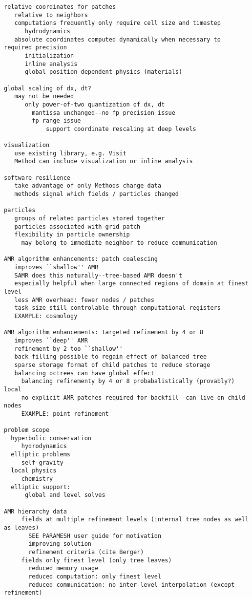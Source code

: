\documentclass[14pt,letter]{article}
\begin{document}
\begin{verbatim}
relative coordinates for patches   
   relative to neighbors
   computations frequently only require cell size and timestep
      hydrodynamics
   absolute coordinates computed dynamically when necessary to required precision
      initialization
      inline analysis
      global position dependent physics (materials)

global scaling of dx, dt?
   may not be needed
      only power-of-two quantization of dx, dt
        mantissa unchanged--no fp precision issue
        fp range issue
            support coordinate rescaling at deep levels
        
visualization
   use existing library, e.g. Visit
   Method can include visualization or inline analysis

software resilience
   take advantage of only Methods change data
   methods signal which fields / particles changed

particles
   groups of related particles stored together
   particles associated with grid patch
   flexibility in particle ownership
     may belong to immediate neighbor to reduce communication

AMR algorithm enhancements: patch coalescing
   improves ``shallow'' AMR
   SAMR does this naturally--tree-based AMR doesn't
   especially helpful when large connected regions of domain at finest level
   less AMR overhead: fewer nodes / patches
   task size still controlable through computational registers
   EXAMPLE: cosmology

AMR algorithm enhancements: targeted refinement by 4 or 8
   improves ``deep'' AMR
   refinement by 2 too ``shallow''
   back filling possible to regain effect of balanced tree
   sparse storage format of child patches to reduce storage 
   balancing octrees can have global effect
     balancing refinementy by 4 or 8 probabalistically (provably?) local
     no explicit AMR patches required for backfill--can live on child nodes 
     EXAMPLE: point refinement

problem scope
  hyperbolic conservation
     hydrodynamics
  elliptic problems
     self-gravity
  local physics
     chemistry
  elliptic support:
      global and level solves

AMR hierarchy data
     fields at multiple refinement levels (internal tree nodes as well as leaves)
       SEE PARAMESH user guide for motivation
       improving solution
       refinement criteria (cite Berger)
     fields only finest level (only tree leaves)
       reduced memory usage
       reduced computation: only finest level
       reduced communication: no inter-level interpolation (except refinement)


\end{verbatim}
\end{document}
